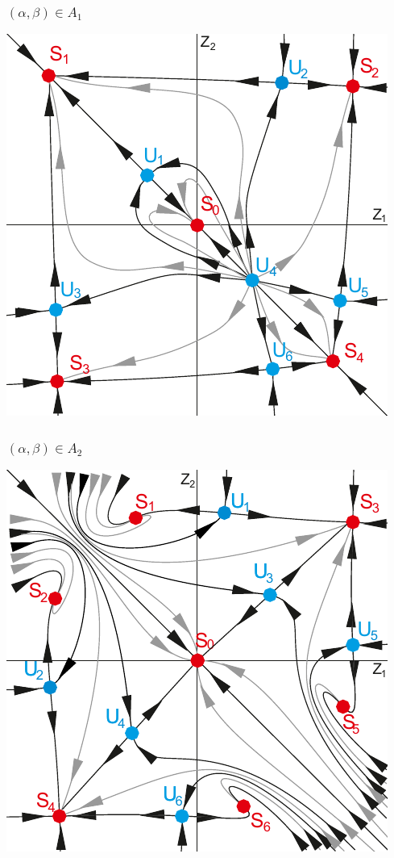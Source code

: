 \documentclass[fullscreen=true, unicode, bookmarks=false]{beamer}
\begin{document}
\begin{frame}
\frametitle{$ (\alpha, \beta) \in A_1 $} 
\begin{center}
  \includegraphics[scale=0.85]{neuI1.pdf}  
 \end{center}
\end{frame}

\begin{frame}
\frametitle{$ (\alpha, \beta) \in A_2 $} 
\begin{center}
  \includegraphics[scale=0.85]{0,056.pdf}  
 \end{center}
\end{frame}
\end{document}
